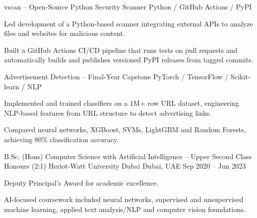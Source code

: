 \documentclass[11pt, a4paper]{awesome-cv}
\begin{document}
\begin{cventries}
  \cventry
    {vscan -- Open-Source Python Security Scanner}
    {Python / GitHub Actions / PyPI}
    {}
    {}
    {
      \begin{cvitems}
        \item {Led development of a Python-based scanner integrating external APIs to analyze files and websites for malicious content.}
        \item {Built a GitHub Actions CI/CD pipeline that runs tests on pull requests and automatically builds and publishes versioned PyPI releases from tagged commits.}
      \end{cvitems}
    }

  \cventry
    {Advertisement Detection -- Final-Year Capstone}
    {PyTorch / TensorFlow / Scikit-learn / NLP}
    {}
    {}
    {
      \begin{cvitems}
        \item {Implemented and trained classifiers on a 1M+ row URL dataset, engineering NLP-based features from URL structure to detect advertising links.}
        \item {Compared neural networks, XGBoost, SVMs, LightGBM and Random Forests, achieving 80\% classification accuracy.}
      \end{cvitems}
    }

\end{cventries}

\begin{cvskills}
\end{cvskills}

\begin{cventries}
  \cventry
    {B.Sc. (Hons) Computer Science with Artificial Intelligence -- Upper Second Class Honours (2:1)}
    {Heriot-Watt University Dubai}
    {Dubai, UAE}
    {Sep 2020 -- Jun 2023}
    {
      \begin{cvitems}
        \item {Deputy Principal's Award for academic excellence.}
        \item {AI-focused coursework included neural networks, supervised and unsupervised machine learning, applied text analysis/NLP and computer vision foundations.}
      \end{cvitems}
    }
\end{cventries}
\end{document}
